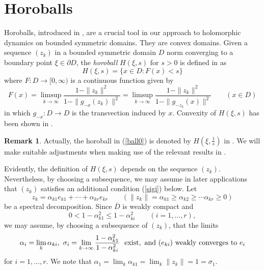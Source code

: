 \documentclass[12pt, twoside]{article}
\theoremstyle{definition}
\newtheorem*{xrem}{Remark}
\numberwithin{equation}{section}
\begin{document}
\section{Horoballs}\label{Horo}

Horoballs, introduced in \cite{horo}, are a crucial tool in our approach to holomorphic dynamics on bounded symmetric domains.
They are convex domains. Given a sequence $(z_k)$ in
a bounded symmetric domain $D$  norm converging to a boundary point $\xi \in \partial D$, the {\it horoball} $H(\xi, s)$ for
 $s>0$ is defined in \cite[Theorem 4.4]{horo} as
\begin{equation}\label{ball0}
H(\xi,s) = \{ x\in D: F (x) <s\}
\end{equation}
where $F: D \longrightarrow [0,\infty)$ is a continuous function given by
$$F (x) = \limsup_{k\rightarrow \infty} \frac{1-\|z_k\|^2}{1-\|g_{-x}(z_k)\|^2} =\limsup_{k\rightarrow \infty} \frac{1-\|z_k\|^2}{1-\|g_{-z_k}(x)\|^2} \qquad (x\in D)$$
in which $g_{-x}: D \longrightarrow D$ is the transvection induced by $x$.
Convexity of $H(\xi,s)$ has been shown in \cite[Theorem 4.4]{horo}.

 \begin{xrem} Actually, the horoball in (\ref{ball0}) is denoted by $H(\xi, \frac{1}{s})$ in \cite{horo}.
 We will make suitable adjustments when making use of the relevant results in \cite{horo}.
\end{xrem}

Evidently, the definition of $H(\xi,s)$ depends on the sequence $(z_k)$. Nevertheless, by choosing a subsequence, we may
assume  in later applications that $(z_k)$ satisfies an additional condition (\ref{sigi}) below. Let
$$z_k = \alpha_{k 1}e_{k1} +\cdots + \alpha_{kr}e_{kr}\qquad
(\|z_k\|=\alpha_{k1} \geq \alpha_{k2} \geq \cdots \alpha_{kr}\geq 0)$$
be a spectral decomposition.  Since $\overline D$ is weakly compact and
$$0<1-\alpha_{k1}^2 \leq 1-\alpha_{ki}^2 \qquad  (i = 1, \ldots, r),$$
we may assume, by choosing a subsequence of $(z_k)$, that the limits
\begin{equation}\label{sigi}
\alpha_i = \lim_k \alpha_{ki}, ~ \sigma_i =\lim_{k\rightarrow \infty} \frac{1-\alpha_{k1}^2}{ 1-\alpha_{ki}^2}
~~{\rm exist, ~ and~}(e_{ki}) ~{\rm weakly~ converges~to~} e_i
\end{equation}
for $i = 1, \ldots, r$. We note that $\alpha_1 =\lim_k \alpha_{k1} =\lim_k \|z_k\|=1= \sigma_1$.
\end{document}
